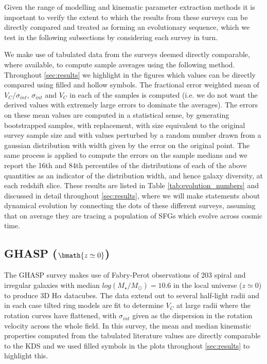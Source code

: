 \documentclass[fleqn,usenatbib]{mnras}
\begin{document}
Given the range of modelling and kinematic parameter extraction methods it is important to verify the extent to which the results from these surveys can be directly compared and treated as forming an evolutionary sequence, which we test in the following subsections by considering each survey in turn.

We make use of tabulated data from the surveys deemed directly comparable, where available, to compute sample averages using the following method. 
Throughout \cref{sec:results} we highlight in the figures which values can be directly compared using filled and hollow symbols.
The fractional error weighted mean of $V_{C}/\sigma_{int}$, $\sigma_{int}$ and $V_{C}$ in each of the samples is computed (i.e. we do not want the derived values with extremely large errors to dominate the averages).
The errors on these mean values are computed in a statistical sense, by generating bootstrapped samples, with replacement, with size equivalent to the original survey sample size and with values perturbed by a random number drawn from a gaussian distribution with width given by the error on the original point.
The same process is applied to compute the errors on the sample medians and we report the 16th and 84th percentiles of the distributions of each of the above quantities as an indicator of the distribution width, and hence galaxy diversity, at each redshift slice.
These results are listed in Table \ref{tab:evolution_numbers} and discussed in detail throughout \cref{sec:results}, where we will make statements about dynamical evolution by connecting the dots of these different surveys, assuming that on average they are tracing a population of SFGs which evolve across cosmic time. 

\subsection{GHASP ($\bmath{z\simeq0}$)}\label{subsec:GHASP}
The GHASP survey \citep[E08]{Epinat2008,Epinat2008a} makes use of Fabry-Perot observations of 203 spiral and irregular galaxies with median $log(M_{\star}/M_{\odot})=10.6$ in the local universe ($z\simeq0$) to produce 3D H$\alpha$ datacubes.
The data extend out to several half-light radii and in each case tilted ring models are fit to determine $V_{C}$ at large radii where the rotation curves have flattened, with $\sigma_{int}$ given as the dispersion in the rotation velocity across the whole field.
In this survey, the mean and median kinematic properties computed from the tabulated literature values are directly comparable to the KDS and we used filled symbols in the plots throughout \cref{sec:results} to highlight this.
\end{document}

